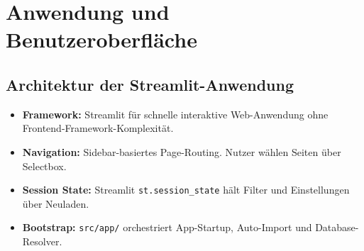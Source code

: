 \section{Anwendung und Benutzeroberfläche}

\subsection{Architektur der Streamlit-Anwendung}
\begin{itemize}
  \item \textbf{Framework:} Streamlit für schnelle interaktive Web-Anwendung ohne Frontend-Framework-Komplexität. %
  \item \textbf{Navigation:} Sidebar-basiertes Page-Routing. Nutzer wählen Seiten über Selectbox. %
  \item \textbf{Session State:} Streamlit \texttt{st.session\_state} hält Filter und Einstellungen über Neuladen. %
  \item \textbf{Bootstrap:} \texttt{src/app/} orchestriert App-Startup, Auto-Import und Database-Resolver. %
\end{itemize}

